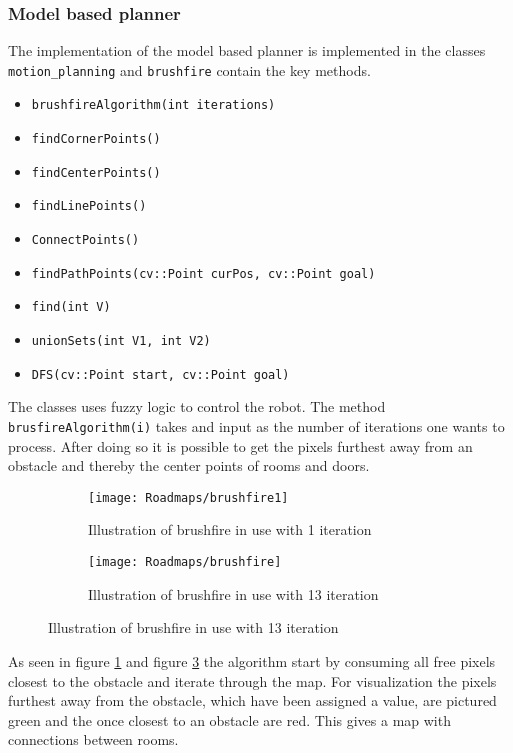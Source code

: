 \documentclass[../Head/Main.tex]{subfiles}
\begin{document}
\subsubsection{Model based planner}

The implementation of the model based planner is implemented in the classes \texttt{motion\_planning} and \texttt{brushfire} contain the key methods.
\begin{itemize}
	\item \texttt{brushfireAlgorithm(int iterations)}
	\item \texttt{findCornerPoints()}
	\item \texttt{findCenterPoints()}
	\item \texttt{findLinePoints()}
	\item \texttt{ConnectPoints()}
	\item \texttt{findPathPoints(cv::Point curPos, cv::Point goal)}
	\item \texttt{find(int V)}
	\item \texttt{unionSets(int V1, int V2)}
	\item \texttt{DFS(cv::Point start, cv::Point goal)}
\end{itemize}
The classes uses fuzzy logic to control the robot. The method \texttt{brusfireAlgorithm(i)} takes and input as the number of iterations one wants to process. After doing so it is possible to get the pixels furthest away from an obstacle and thereby the center points of rooms and doors.   
\begin{figure}[H]
  \begin{subfigure}[b]{0.49\textwidth}
    \centering
    \texttt{[image: Roadmaps/brushfire1]}
    \caption{Illustration of brushfire in use with 1 iteration}
    \label{fig:Brushfire1}
  \end{subfigure}
  \hfill
   \begin{subfigure}[b]{0.49\textwidth}
    \centering
    \texttt{[image: Roadmaps/brushfire]}
    \caption{Illustration of brushfire in use with 13 iteration}
    \label{fig:Brusfire2}
  \end{subfigure}
  \end{figure}
  
As seen in figure \ref{fig:Brushfire1} and figure \ref{fig:Brusfire2} the algorithm start by consuming all free pixels closest to the obstacle and iterate through the map. For visualization the pixels furthest away from the obstacle, which have been assigned a value, are pictured green and the once closest to an obstacle are red. This gives a map with connections between rooms. 
  
\end{document}
